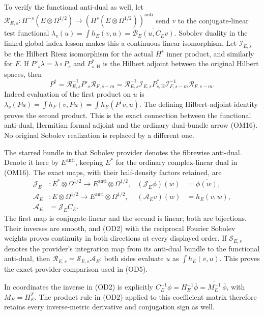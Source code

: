 \documentclass[
  11pt,
]{article}
\begin{document}
To verify the functional anti-dual as well, let
\(\mathcal R_{E,s}:H^{-s}(E\otimes\Omega^{1/2})
 \to(H^s(E\otimes\Omega^{1/2}))^{\mathrm{anti}}\) send \(v\) to the
conjugate-linear test functional
\(\lambda_v(u)=\int h_E(v,u)=\overline{\mathcal B_E(u,C_Ev)}\). Sobolev
duality in the linked global-index lesson makes this a continuous linear
isomorphism. Let \(\mathcal I_{E,s}\) be the Hilbert Riesz isomorphism
for the actual \(H^s\) inner product, and similarly for \(F\). If
\(P'_s\lambda=\lambda\circ P_s\) and \(P_{s,\mathrm H}^*\) is the
Hilbert adjoint between the original Hilbert spaces, then \[
 P^\dagger=\mathcal R_{E,s}^{-1}P'_s\mathcal R_{F,s-m}
 =\mathcal R_{E,s}^{-1}\mathcal I_{E,s}
       P_{s,\mathrm H}^*
       \mathcal I_{F,s-m}^{-1}\mathcal R_{F,s-m}.
 \tag{OD5}
\] Indeed evaluation of the first product on \(u\) is
\(\lambda_v(Pu)=\int h_F(v,Pu)=\int h_E(P^\dagger v,u)\). The defining
Hilbert-adjoint identity proves the second product. This is the exact
connection between the functional anti-dual, Hermitian formal adjoint
and the ordinary dual-bundle arrow (OM16). No original Sobolev
realization is replaced by a different one.

The starred bundle in that Sobolev provider denotes the fibrewise
anti-dual. Denote it here by \(E^{\mathrm{anti}}\), keeping \(E^*\) for
the ordinary complex-linear dual in (OM16). The exact maps, with their
half-density factors retained, are \[
 \begin{aligned}
 \mathcal J_E &:E^*\otimes\Omega^{1/2}
                  \longrightarrow E^{\mathrm{anti}}\otimes\Omega^{1/2},
 & (\mathcal J_E\phi)(w)&=\overline{\phi(w)},\\
 \mathcal A_E &:E\otimes\Omega^{1/2}
                  \longrightarrow E^{\mathrm{anti}}\otimes\Omega^{1/2},
 & (\mathcal A_Ev)(w)&=h_E(v,w),\\
 \mathcal A_E&=\mathcal J_E C_E.
 \end{aligned}
 \tag{OA0}
\] The first map is conjugate-linear and the second is linear; both are
bijections. Their inverses are smooth, and (OD2) with the reciprocal
Fourier Sobolev weights proves continuity in both directions at every
displayed order. If \(\mathcal S_{E,s}\) denotes the provider's
integration map from its anti-dual bundle to the functional anti-dual,
then \(\mathcal R_{E,s}=\mathcal S_{E,s}\mathcal A_E\): both sides
evaluate \(u\) as \(\int h_E(v,u)\). This proves the exact provider
comparison used in (OD5).

In coordinates the inverse in (OD2) is explicitly
\(C_E^{-1}\phi=H_E^{-1}\overline\phi
=\overline{M_E^{-1}}\,\overline\phi\), with \(M_E=H_E^T\). The product
rule in (OD2) applied to this coefficient matrix therefore retains every
inverse-metric derivative and conjugation sign as well.
\end{document}
